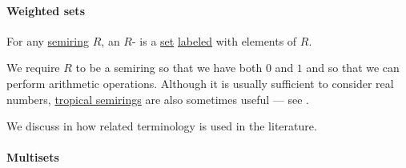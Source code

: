 \paragraph{Weighted sets}

\begin{definition}\label{def:weighted_set}\mimprovised
  For any \hyperref[def:semiring]{semiring} \( R \), an \( R \)- is a \hyperref[def:set]{set} \hyperref[def:labeled_set]{labeled} with elements of \( R \).
\end{definition}
\begin{comments}
  \item We require \( R \) to be a semiring so that we have both \( 0 \) and \( 1 \) and so that we can perform arithmetic operations. Although it is usually sufficient to consider real numbers, \hyperref[def:tropical_semiring]{tropical semirings} are also sometimes useful --- see .

  \item We discuss in  how related terminology is used in the literature.
\end{comments}

\paragraph{Multisets}

